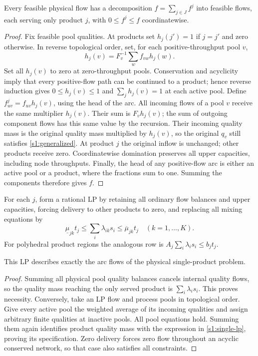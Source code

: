 \begin{lemma}\label{s1:destination}
Every feasible physical flow has a decomposition
$f=\sum_{j\in J}f^j$ into feasible flows, each serving only product $j$,
with $0\le f^j\le f$ coordinatewise.
\end{lemma}
\begin{proof}
Fix feasible pool qualities. At products set
$h_j(j')=1$ if $j=j'$ and zero otherwise. In reverse topological order,
set, for each positive-throughput pool $v$,
\[
 h_j(v)=F_v^{-1}\sum_wf_{vw}h_j(w).
\]
Set all $h_j(v)$ to zero at zero-throughput pools. Conservation and
acyclicity imply that every positive-flow path can be continued to a
product; hence reverse induction gives $0\le h_j(v)\le1$ and
$\sum_jh_j(v)=1$ at each active pool. Define
$f^j_{uv}=f_{uv}h_j(v)$, using the head of the arc.
All incoming flows of a pool $v$ receive the same multiplier $h_j(v)$.
Their sum is $F_vh_j(v)$; the sum of outgoing component flows has this
same value by the recursion. Their incoming quality mass is the original
quality mass multiplied by $h_j(v)$, so the original $q_v$ still satisfies
\eqref{s1:generalized}. At product $j$ the original inflow is unchanged;
other products receive zero. Coordinatewise domination preserves all
upper capacities, including node throughputs. Finally, the head of any
positive-flow arc is either an active pool or a product, where the
fractions sum to one. Summing the components therefore gives $f$.
\end{proof}

For each $j$, form a rational LP by retaining all ordinary flow balances
and upper capacities, forcing delivery to other products to zero, and
replacing all mixing equations by
\begin{equation}
 \underline\mu_{jk}t_j\le\sum_i\lambda_{ik}s_i
                   \le\overline\mu_{jk}t_j\quad(k=1,\ldots,K).
 \label{s1:single-lp}
\end{equation}
For polyhedral product regions the analogous row is
$A_j\sum_i\lambda_is_i\le b_jt_j$.

\begin{lemma}\label{s1:single}
This LP describes exactly the arc flows of the physical single-product
problem.
\end{lemma}
\begin{proof}
Summing all physical pool quality balances cancels internal quality
flows, so the quality mass reaching the only served product is
$\sum_i\lambda_is_i$. This proves necessity. Conversely, take an LP
flow and process pools in topological order. Give every active pool the
weighted average of its incoming qualities and assign arbitrary finite
qualities at inactive pools. All pool equations hold. Summing them again
identifies product quality mass with the expression in
\eqref{s1:single-lp}, proving its specification. Zero delivery forces
zero flow throughout an acyclic conserved network, so that case also
satisfies all constraints.
\end{proof}

